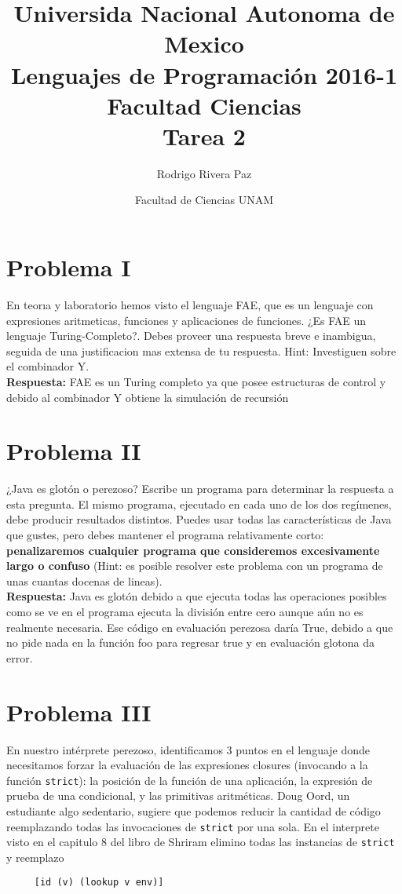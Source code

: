 \documentclass{article}
\title{Universida Nacional Autonoma de Mexico\\Lenguajes de Programación 2016-1\\Facultad Ciencias\\Tarea 2}
\author{Rodrigo Rivera Paz\\}
\date{Facultad de Ciencias UNAM}
\begin{document}
\maketitle
\section*{Problema I}
En teorıa y laboratorio hemos visto el lenguaje FAE, que es un lenguaje con expresiones aritmeticas, funciones y aplicaciones de funciones. ¿Es FAE un lenguaje Turing-Completo?. Debes proveer una respuesta breve e inambigua, seguida de una justificacion mas extensa de tu respuesta. Hint: Investiguen sobre el combinador Y.
\\

\textbf{Respuesta: }
FAE es un Turing completo ya que posee estructuras de control y debido al combinador Y obtiene la simulación de recursión

\section*{Problema II}
¿Java es glotón o perezoso? Escribe un programa para determinar la respuesta a esta
pregunta. El mismo programa, ejecutado en cada uno de los dos regímenes, debe
producir resultados distintos. Puedes usar todas las características de Java
que gustes, pero debes mantener el programa relativamente corto:
\textbf{penalizaremos cualquier programa que consideremos excesivamente
  largo o confuso } (Hint: es posible resolver este problema con un programa
de unas cuantas docenas de lineas).
\\

\textbf{Respuesta: }
Java es glotón debido a que ejecuta todas las operaciones posibles como se ve en el programa ejecuta la división entre cero aunque aún no es realmente necesaria. Ese código en evaluación perezosa daría True, debido a que no pide nada en la función foo para regresar true y en evaluación glotona da error.


\section*{Problema III}
En nuestro intérprete perezoso, identificamos 3 puntos en el lenguaje donde
necesitamos forzar la evaluación de las expresiones closures (invocando a la
función \texttt{strict}): la posición de la función de una aplicación,
la expresión de prueba de una condicional, y las primitivas aritméticas.
Doug Oord, un estudiante algo sedentario, sugiere que podemos reducir
la cantidad de código reemplazando todas las invocaciones de \texttt{strict}
por una sola. En el interprete visto en el capitulo 8 del libro de Shriram
elimino todas las instancias de \texttt{strict} y reemplazo
\begin{verbatim}
     [id (v) (lookup v env)]
\end{verbatim}
\end{document}
